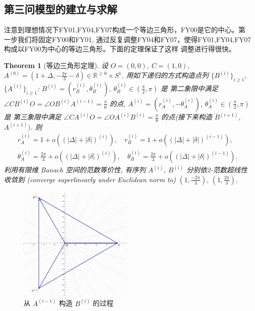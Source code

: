 \documentclass{my_paper}
\newcommand{\R}{\mathbb{R}}
\newtheorem{theorem}{Theorem}
\begin{document}
\subsection{第三问模型的建立与求解}
    注意到理想情况下FY01,FY04,FY07构成一个等边三角形，FY00是它的中心。第一步我们将固定FY00和FY01,
    通过反复调整FY04和FY07，使得FY01,FY04,FY07构成以FY00为中心的等边三角形。下面的定理保证了这样
    调整进行得很快。
\begin{theorem}[等边三角形定理]
\label{dbsjx} 
    设 $O=(0,0)$, $C=(1,0)$,   
    $A^{(0)}=(1+\Delta,-\frac{2\pi}3-\delta)\in \R^{\geq 0}\times S^1$. 用如下递归的方式构造点列
    $\{B^{(i)}\}_{i\geq 1}$, $\{A^{(i)}\}_{i\geq 1}$: 
    $B^{(i)}=(r_B^{(i)},\theta_B^{(i)})$, $\theta_{B}^{(i)}\in (\frac \pi 2,\pi)$ 是
    第二象限中满足 $\angle CB^{(i)}O=\angle OB^{(i)}A^{(i-1)}=\frac\pi6$ 的点, 
    $A^{(i)}=(r_A^{(i)},-\theta_A^{(i)})$, $\theta_{A}^{(i)}\in (\frac \pi 2,\pi)$ 是
    第三象限中满足 $\angle CA^{(i)}O=\angle OA^{(i)}B^{(i)}=\frac\pi6$ 的点(接下来构造 $B^{(i+1)}$, $A^{(i+1)})$. 
    则 
    \begin{equation}
    \begin{aligned}
        r_A^{(i)}=1+o((|\Delta|+|\delta|)^{(i)}),\quad r_B^{(i)}=1+o((|\Delta|+|\delta|)^{(i-1)}),
        \\
        \theta_A^{(i)}=\frac{2\pi}{3}+o((|\Delta|+|\delta|)^{(i)}),\quad \theta_B^{(i)}=\frac{2\pi}{3}+o((|\Delta|+|\delta|)^{(i-1)}).
    \end{aligned}
    \label{1}
    \end{equation}
    利用有限维 Banach 空间的范数等价性, 有序列 $A^{(i)}$, $B^{(i)}$ 分别依2-范数超线性收敛到
    (converge superlinearly\cite{dennis1974characterization} under Euclidean norm to) $(1,\frac{-2\pi}3)$, $(1,\frac{2\pi}3)$.
\end{theorem} 

\begin{figure}[H]
    \centering
    \includegraphics[width=0.5\textwidth]{sketch1}
    \caption{从 $A^{(i-1)}$ 构造 $B^{(i)}$ 的过程} 
\end{figure}
\end{document}
